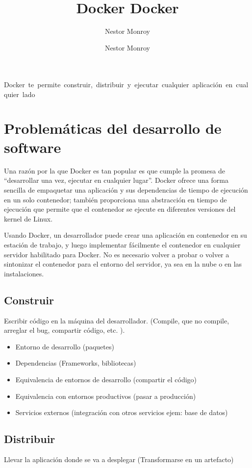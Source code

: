 \documentclass{article}
\title{
    \huge{\bf \mbox{Docker} }
}
\author{\huge Nestor Monroy}
\title{
    \huge{\bf \mbox{Docker} }
}
\author{\huge Nestor Monroy}
\begin{document}
\addtolength{\topmargin}{2in}
\maketitle
\thispagestyle{empty}
\clearpage
{}
\newpage
\restoregeometry
\tableofcontents

\newpage
\mbox{Docker te permite construir, distribuir y ejecutar cualquier aplicación en cualquier lado}\

\section{Problemáticas del desarrollo de software}\label{probuildsoftware}
Una razón por la que Docker es tan popular es que cumple la promesa de “desarrollar una vez, ejecutar en cualquier lugar”. Docker ofrece una forma sencilla de empaquetar una aplicación y sus dependencias de tiempo de ejecución en un solo contenedor; también proporciona una abstracción en tiempo de ejecución que permite que el contenedor se ejecute en diferentes versiones del kernel de Linux.

Usando Docker, un desarrollador puede crear una aplicación en contenedor en su estación de trabajo, y luego implementar fácilmente el contenedor en cualquier servidor habilitado para Docker. No es necesario volver a probar o volver a sintonizar el contenedor para el entorno del servidor, ya sea en la nube o en las instalaciones.
\subsection{Construir}
Escribir código en la máquina del desarrollador. (Compile, que no compile, arreglar el bug, compartir código, etc. ).

\begin{itemize}
    \item Entorno de desarrollo (paquetes)
    \item Dependencias (Frameworks, bibliotecas)
    \item Equivalencia de entornos de desarrollo (compartir el código)
    \item Equivalencia con entornos productivos (pasar a producción)
    \item Servicios externos (integración con otros servicios ejem: base de datos)
\end{itemize}

\subsection{Distribuir}
Llevar la aplicación donde se va a desplegar (Transformarse en un artefacto)
\end{document}
